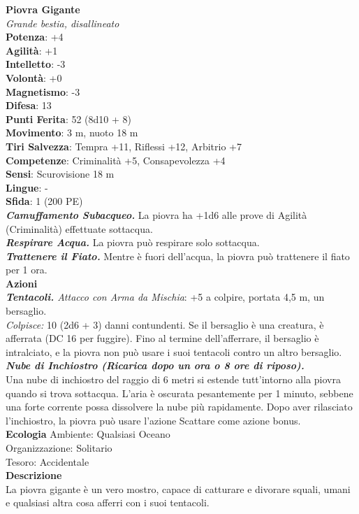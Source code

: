 \begin{multicols}{2}
\medskip\textbf{Piovra Gigante}\\
\emph{Grande bestia, disallineato}\\
\textbf{Potenza}: +4\\
\textbf{Agilità}: +1\\
\textbf{Intelletto}: -3\\
\textbf{Volontà}: +0\\
\textbf{Magnetismo}: -3\\
\textbf{Difesa}: 13\\
\textbf{Punti Ferita}: 52 (8d10 + 8)\\
\textbf{Movimento}: 3 m, nuoto 18 m\\
\textbf{Tiri Salvezza}: Tempra +11, Riflessi +12, Arbitrio +7 \\
\textbf{Competenze}: Criminalità +5, Consapevolezza +4\\
\textbf{Sensi}: Scurovisione 18 m\\
\textbf{Lingue}: -\\
\textbf{Sfida}: 1 (200 PE)\smallskip\\
\emph{\textbf{Camuffamento Subacqueo.}} La piovra ha +1d6 alle prove di Agilità (Criminalità) effettuate sottacqua.\\
\emph{\textbf{Respirare Acqua.}} La piovra può respirare solo sottacqua.\\
\emph{\textbf{Trattenere il Fiato.}} Mentre è fuori dell'acqua, la piovra può trattenere il fiato per 1 ora.\\
\smallskip\textbf{Azioni}\\
\emph{\textbf{Tentacoli.} Attacco con Arma da Mischia}: +5 a colpire, portata 4,5 m, un bersaglio.\\
\emph{Colpisce:} 10 (2d6 + 3) danni contundenti. Se il bersaglio è una creatura, è afferrata (DC 16 per fuggire). Fino al termine dell'afferrare, il bersaglio è intralciato, e la piovra non può usare i suoi tentacoli contro un altro bersaglio.\\
\emph{\textbf{Nube di Inchiostro (Ricarica dopo un ora o 8 ore di riposo).}}\\
Una nube di inchiostro del raggio di 6 metri si estende tutt'intorno alla piovra quando si trova sottacqua. L'aria è oscurata pesantemente per 1 minuto, sebbene una forte corrente  possa dissolvere la nube più rapidamente. Dopo aver rilasciato  l'inchiostro, la piovra può usare l'azione Scattare come azione bonus. \\
\textbf{Ecologia}
Ambiente: Qualsiasi Oceano\\
Organizzazione: Solitario\\
Tesoro: Accidentale\\
\textbf{Descrizione}\\
La piovra gigante è un vero mostro, capace di catturare e divorare squali, umani e qualsiasi altra cosa afferri con i suoi tentacoli. \\


\end{multicols}
